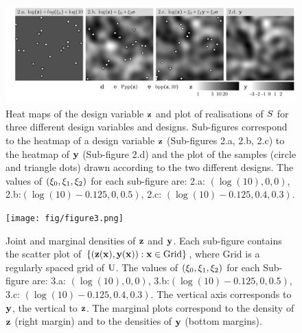 \begin{example}
\begin{figure}[ht]
    \caption{Heat maps of the design variable $\mathbf{z}$ and plot of realisations of $S$ for three different design variables and designs. Sub-figures correspond to the  heatmap of a design variable $\mathbf{z}$ (Sub-figures 2.a, 2.b, 2.c) to the heatmap of $\mathbf{y}$ (Sub-figure 2.d) and the plot of the samples (circle and triangle dots) drawn according to the two different designs. The values of $(\xi_0, \xi_1 ,\xi_2)$ for each sub-figure are: 2.a: $(\log(10),0,0)$, 2.b:$(\log(10)-0.125,0,0.5)$, 2.c: $(\log(10)-0.125,0.4,0.3)$.}
    \label{fig:oaijsfdwefweoij}
    \hspace{-.6cm}\includegraphics{fig/figure2.png}


\end{figure}



\begin{figure}[ht]
\caption{Joint and marginal densities of $\mathbf{z}$ and $\mathbf{y}$.  Each sub-figure contains the scatter plot of  $\left\{\left(\mathbf{z}(\mathbf{x}),\mathbf{y}(\mathbf{x})\right):\mathbf{x}\in\mathrm{Grid}\right\}$, where $\mathrm{Grid}$ is a regularly spaced grid of $\mathrm{U}$. The values of $(\xi_0, \xi_1 ,\xi_2)$ for each Sub-figure are: 3.a: $(\log(10),0,0)$, 3.b:$(\log(10)-0.125,0,0.5)$, 3.c: $(\log(10)-0.125,0.4,0.3)$. The vertical axis corresponds to $\mathbf{y}$, the vertical to $\mathbf{z}$. The marginal plots correspond to the density of $\mathbf{z}$ (right margin) and to the densities of $\mathbf{y}$ (bottom margins).}\label{fig:jointmarginaldensitiesYZ}
\texttt{[image: fig/figure3.png]}
\end{figure}
\end{example}


